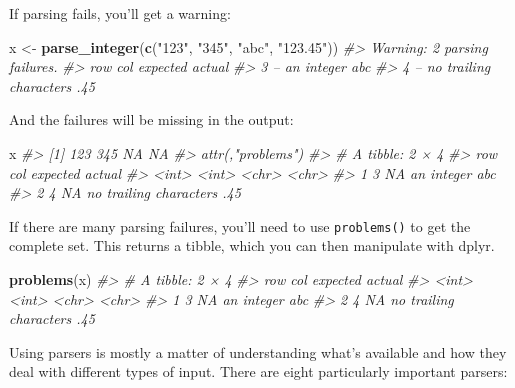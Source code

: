 \documentclass[]{book}
\newenvironment{Shaded}{\begin{snugshade}}{\end{snugshade}}
\newcommand{\KeywordTok}[1]{\textcolor[rgb]{0.13,0.29,0.53}{\textbf{{#1}}}}
\newcommand{\StringTok}[1]{\textcolor[rgb]{0.31,0.60,0.02}{{#1}}}
\newcommand{\CommentTok}[1]{\textcolor[rgb]{0.56,0.35,0.01}{\textit{{#1}}}}
\newcommand{\NormalTok}[1]{{#1}}
\begin{document}
If parsing fails, you'll get a warning:

\begin{Shaded}
\begin{Highlighting}[]
\NormalTok{x <-}\StringTok{ }\KeywordTok{parse_integer}\NormalTok{(}\KeywordTok{c}\NormalTok{(}\StringTok{"123"}\NormalTok{, }\StringTok{"345"}\NormalTok{, }\StringTok{"abc"}\NormalTok{, }\StringTok{"123.45"}\NormalTok{))}
\CommentTok{#> Warning: 2 parsing failures.}
\CommentTok{#> row col               expected actual}
\CommentTok{#>   3  -- an integer                abc}
\CommentTok{#>   4  -- no trailing characters    .45}
\end{Highlighting}
\end{Shaded}

And the failures will be missing in the output:

\begin{Shaded}
\begin{Highlighting}[]
\NormalTok{x}
\CommentTok{#> [1] 123 345  NA  NA}
\CommentTok{#> attr(,"problems")}
\CommentTok{#> # A tibble: 2 × 4}
\CommentTok{#>     row   col               expected actual}
\CommentTok{#>   <int> <int>                  <chr>  <chr>}
\CommentTok{#> 1     3    NA             an integer    abc}
\CommentTok{#> 2     4    NA no trailing characters    .45}
\end{Highlighting}
\end{Shaded}

If there are many parsing failures, you'll need to use
\texttt{problems()} to get the complete set. This returns a tibble,
which you can then manipulate with dplyr.

\begin{Shaded}
\begin{Highlighting}[]
\KeywordTok{problems}\NormalTok{(x)}
\CommentTok{#> # A tibble: 2 × 4}
\CommentTok{#>     row   col               expected actual}
\CommentTok{#>   <int> <int>                  <chr>  <chr>}
\CommentTok{#> 1     3    NA             an integer    abc}
\CommentTok{#> 2     4    NA no trailing characters    .45}
\end{Highlighting}
\end{Shaded}

Using parsers is mostly a matter of understanding what's available and
how they deal with different types of input. There are eight
particularly important parsers:
\end{document}
